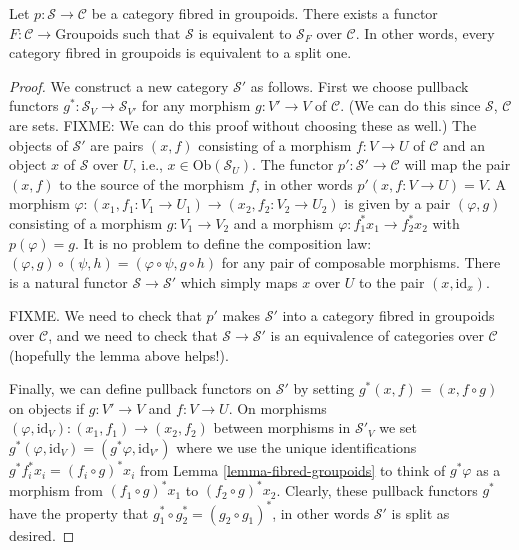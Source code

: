\begin{lemma} 
\label{lemma-fibred-strict}
Let $ p : \mathcal{S} \to \mathcal{C}$ be a category fibred in groupoids.
There exists a functor $F : \mathcal{C} \to \text{Groupoids}$ such that 
$\mathcal{S}$ is equivalent to $\mathcal{S}_F$ over $\mathcal{C}$. In other 
words, every category fibred in groupoids is equivalent to a split one.
\end{lemma}

\begin{proof} 
We construct a new category $\mathcal{S}'$ as follows. First we choose 
pullback functors $g^\ast : \mathcal{S}_V \to \mathcal{S}_{V'}$ for any 
morphism $g : V' \to V$ of $\mathcal{C}$. (We can do this since 
$\mathcal{S}$, $\mathcal{C}$ are sets. FIXME: We can do this proof without
choosing these as well.) The objects of $\mathcal{S}'$ 
are pairs $(x,f)$ consisting of a morphism $f : V \to U$ of $\mathcal{C}$
and an object $x$ of $\mathcal{S}$ over $U$, i.e., 
$x\in \text{Ob}(\mathcal{S}_U)$. The functor 
$p' : \mathcal{S}' \to \mathcal{C}$ will map the pair $(x,f)$ to the source 
of the morphism $f$, in other words $p'(x,f:V\to U) = V$. A morphism 
$\varphi : (x_1,f_1: V_1 \to U_1) \to (x_2, f_2 : V_2 \to U_2)$ is given by a 
pair $(\varphi,g)$ consisting of a morphism $g : V_1 \to V_2$ and a morphism 
$\varphi : f_1^\ast x_1 \to f_2^\ast x_2$ with $p(\varphi) = g$. It is no 
problem to define the composition law: $(\varphi,g) \circ (\psi,h) = 
(\varphi \circ \psi, g\circ h)$ for any pair of composable morphisms. 
There is a natural functor $\mathcal{S} \to \mathcal{S}'$ which simply maps
$x$ over $U$ to the pair $(x, \text{id}_x)$.

\medskip\noindent
FIXME. We need to check that $p'$ makes $\mathcal{S}'$ into a category
fibred in groupoids over $\mathcal{C}$, and we need to check that 
$\mathcal{S} \to \mathcal{S}'$ is an equivalence of categories over 
$\mathcal{C}$ (hopefully the lemma above helps!). 

\medskip\noindent
Finally, we can define pullback functors on $\mathcal{S}'$ 
by setting $g^\ast(x,f) = (x, f \circ g)$ on objects if $g : V' \to V$ and
$f : V \to U$. On morphisms $(\varphi,\text{id}_V) : (x_1, f_1) \to (x_2,f_2)$
between morphisms in $\mathcal{S}'_V$ we set $g^\ast(\varphi,\text{id}_V) =
(g^\ast\varphi, \text{id}_{V'})$ where we use the unique identifications
$g^\ast f_i^\ast x_i = (f_i \circ g)^\ast x_i$ from Lemma 
\ref{lemma-fibred-groupoids} to think of $g^\ast\varphi$ as a morphism from
$(f_1 \circ g)^\ast x_1$ to $(f_2 \circ g)^\ast x_2$. Clearly, these pullback
functors $g^\ast$ have the property that
$g_1^\ast \circ g_2^\ast = (g_2\circ g_1)^\ast$, in other words $\mathcal{S}'$
is split as desired.
\end{proof}

